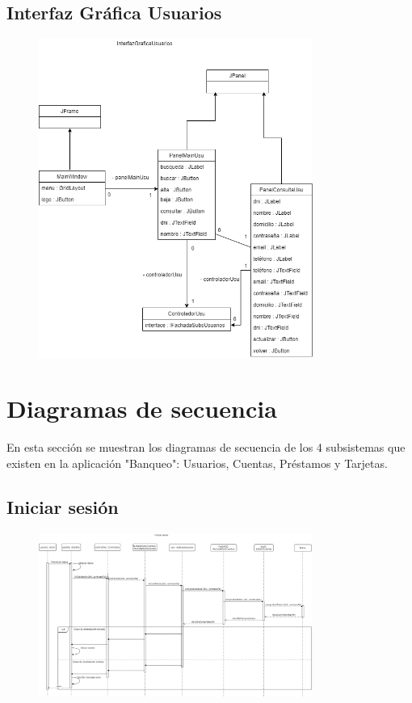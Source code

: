 \documentclass[12pt]{article}
\begin{document}
\subsection{Interfaz Gráfica Usuarios}
\begin{figure}[H]
    \centering
    \includegraphics[width=0.8\textwidth]{InterfazGraficaUsuarios1.png}
\end{figure}

\newpage
\section{Diagramas de secuencia} %
En esta sección se muestran los diagramas de secuencia de los 4 subsistemas que existen en la aplicación "Banqueo": Usuarios, Cuentas, Préstamos y Tarjetas.
\subsection{Iniciar sesión}
\begin{figure}[H]
    \centering
    \includegraphics[width=0.8\textwidth]{iniciar_sesion.png}
\end{figure}
\end{document}
